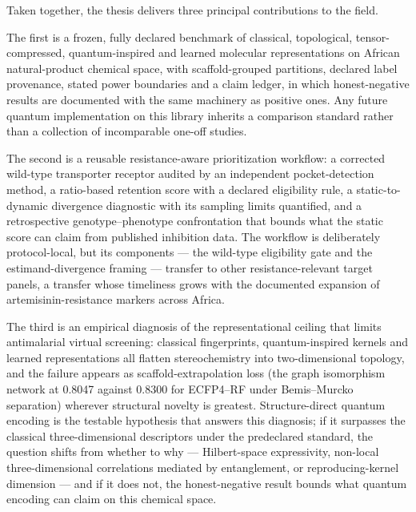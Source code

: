 Taken together, the thesis delivers three principal contributions to the field.

The first is a frozen, fully declared benchmark of classical, topological, tensor-compressed, quantum-inspired and learned molecular representations on African natural-product chemical space, with scaffold-grouped partitions, declared label provenance, stated power boundaries and a claim ledger, in which honest-negative results are documented with the same machinery as positive ones. Any future quantum implementation on this library inherits a comparison standard rather than a collection of incomparable one-off studies.

The second is a reusable resistance-aware prioritization workflow: a corrected wild-type transporter receptor audited by an independent pocket-detection method, a ratio-based retention score with a declared eligibility rule, a static-to-dynamic divergence diagnostic with its sampling limits quantified, and a retrospective genotype--phenotype confrontation that bounds what the static score can claim from published inhibition data. The workflow is deliberately protocol-local, but its components --- the wild-type eligibility gate and the estimand-divergence framing --- transfer to other resistance-relevant target panels, a transfer whose timeliness grows with the documented expansion of artemisinin-resistance markers across Africa.

The third is an empirical diagnosis of the representational ceiling that limits antimalarial virtual screening: classical fingerprints, quantum-inspired kernels and learned representations all flatten stereochemistry into two-dimensional topology, and the failure appears as scaffold-extrapolation loss (the graph isomorphism network at \num{0.8047} against \num{0.8300} for ECFP4--RF under Bemis--Murcko separation) wherever structural novelty is greatest. Structure-direct quantum encoding is the testable hypothesis that answers this diagnosis; if it surpasses the classical three-dimensional descriptors under the predeclared standard, the question shifts from whether to why --- Hilbert-space expressivity, non-local three-dimensional correlations mediated by entanglement, or reproducing-kernel dimension --- and if it does not, the honest-negative result bounds what quantum encoding can claim on this chemical space.

